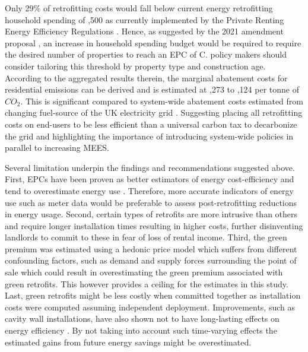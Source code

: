 Only 29\% of retrofitting costs would fall below current energy retrofitting household spending of ,500 as currently implemented by the Private Renting Energy Efficiency Regulations  \cite{department_for_energy_security_and_net_zero_and_department_for_business_energy__industrial_strategy_standard_2023}. Hence, as suggested by the 2021 amendment proposal \cite{department_for_energy_security_and_net_zero_desnz_and_department_for_business_energy_and_industrial_strategy_beis_heat_2021}, an increase in household spending budget would be required to require the desired number of properties to reach an EPC of C. policy makers should consider tailoring this threshold  by property type and construction age. According to the aggregated results therein, the marginal abatement costs for residential emissions can be derived and is estimated at ,273 to ,124 per tonne of $CO_2$. This is significant compared to system-wide abatement costs estimated from changing fuel-source of the UK electricity grid \cite{mckinsey_company_appendix_2002}. Suggesting placing all retrofitting costs on end-users to be less efficient than a universal carbon tax to decarbonize the grid and highlighting the importance of introducing system-wide policies in parallel to increasing MEES. 


Several limitation underpin the findings and recommendations suggested above. First, EPCs have been proven as better estimators of energy cost-efficiency \cite{kelly_building_2012}and tend to overestimate energy use \cite{few_over-prediction_2023}. Therefore, more accurate indicators of energy use such as meter data would be preferable to assess post-retrofitting reductions in energy usage. Second, certain types of retrofits are more intrusive than others and require longer installation times resulting in higher costs, further disinventing landlords to commit to these in fear of loss of rental income. Third, the green premium was estimated using a hedonic price model which suffers from different confounding factors, such as demand and supply forces surrounding the point of sale which could result in overestimating the green premium associated with green retrofits. This however provides a ceiling for the estimates in this study. Last, green retrofits might be less costly when committed together as installation costs were computed assuming independent deployment. Improvements, such as cavity wall installations, have also shown not to have long-lasting effects on energy efficiency \cite{penasco_assessing_2023}. By not taking into account such time-varying effects the estimated gains from future energy savings might be overestimated. \\

